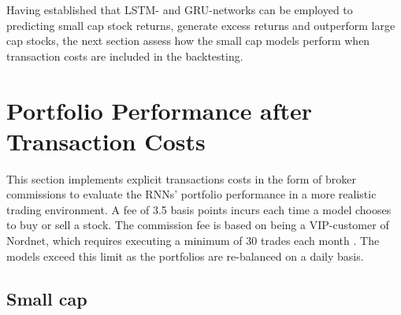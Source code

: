 \indent\newline 
Having established that LSTM- and GRU-networks can be employed to predicting small cap stock returns, generate excess returns and outperform large cap stocks, the next section assess how the small cap models perform when transaction costs are included in the backtesting.

\section{Portfolio Performance after Transaction Costs}
This section implements explicit transactions costs in the form of broker commissions to evaluate the RNNs' portfolio performance in a more realistic trading environment. A fee of 3.5 basis points incurs each time a model chooses to buy or sell a stock. The commission fee is based on being a VIP-customer of Nordnet, which requires executing a minimum of 30 trades each month \cite{nordnet}. The models exceed this limit as the portfolios are re-balanced on a daily basis. 

\subsection{Small cap}
\begin{table}[ht]
\centering
{}
\caption{Small cap trading performance w/t.cost (long, K=5)}
\end{table}

